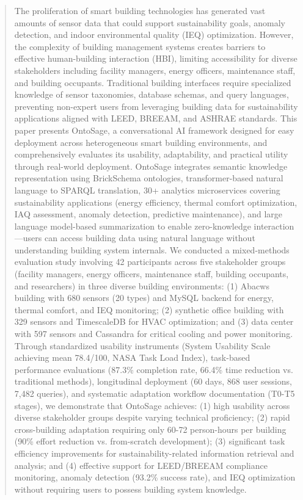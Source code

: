 \documentclass[acmlarge]{acmart}
\begin{document}
\begin{abstract}
The proliferation of smart building technologies has generated vast amounts of sensor data that could support sustainability goals, anomaly detection, and indoor environmental quality (IEQ) optimization. However, the complexity of building management systems creates barriers to effective human-building interaction (HBI), limiting accessibility for diverse stakeholders including facility managers, energy officers, maintenance staff, and building occupants. Traditional building interfaces require specialized knowledge of sensor taxonomies, database schemas, and query languages, preventing non-expert users from leveraging building data for sustainability applications aligned with LEED, BREEAM, and ASHRAE standards.
This paper presents OntoSage, a conversational AI framework designed for easy deployment across heterogeneous smart building environments, and comprehensively evaluates its usability, adaptability, and practical utility through real-world deployment. OntoSage integrates semantic knowledge representation using BrickSchema ontologies, transformer-based natural language to SPARQL translation, 30+ analytics microservices covering sustainability applications (energy efficiency, thermal comfort optimization, IAQ assessment, anomaly detection, predictive maintenance), and large language model-based summarization to enable zero-knowledge interaction—users can access building data using natural language without understanding building system internals.
We conducted a mixed-methods evaluation study involving 42 participants across five stakeholder groups (facility managers, energy officers, maintenance staff, building occupants, and researchers) in three diverse building environments: (1) Abacws building with 680 sensors (20 types) and MySQL backend for energy, thermal comfort, and IEQ monitoring; (2) synthetic office building with 329 sensors and TimescaleDB for HVAC optimization; and (3) data center with 597 sensors and Cassandra for critical cooling and power monitoring. Through standardized usability instruments (System Usability Scale achieving mean 78.4/100, NASA Task Load Index), task-based performance evaluations (87.3\% completion rate, 66.4\% time reduction vs. traditional methods), longitudinal deployment (60 days, 868 user sessions, 7,482 queries), and systematic adaptation workflow documentation (T0-T5 stages), we demonstrate that OntoSage achieves: (1) high usability across diverse stakeholder groups despite varying technical proficiency; (2) rapid cross-building adaptation requiring only 60-72 person-hours per building (90\% effort reduction vs. from-scratch development); (3) significant task efficiency improvements for sustainability-related information retrieval and analysis; and (4) effective support for LEED/BREEAM compliance monitoring, anomaly detection (93.2\% success rate), and IEQ optimization without requiring users to possess building system knowledge.

\end{abstract}
\end{document}

